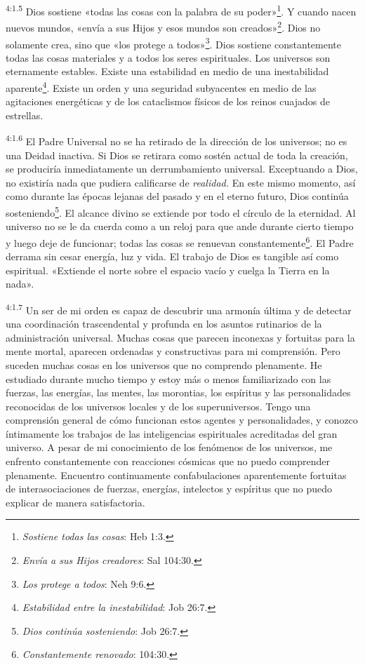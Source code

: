 \par
\textsuperscript{4:1.5} Dios sostiene «todas las cosas con la palabra de su poder»\footnote{\textit{Sostiene todas las cosas}: Heb 1:3.}. Y cuando nacen nuevos mundos, «envía a sus Hijos y esos mundos son creados»\footnote{\textit{Envía a sus Hijos creadores}: Sal 104:30.}. Dios no solamente crea, sino que «los protege a todos»\footnote{\textit{Los protege a todos}: Neh 9:6.}. Dios sostiene constantemente todas las cosas materiales y a todos los seres espirituales. Los universos son eternamente estables. Existe una estabilidad en medio de una inestabilidad aparente\footnote{\textit{Estabilidad entre la inestabilidad}: Job 26:7.}. Existe un orden y una seguridad subyacentes en medio de las agitaciones energéticas y de los cataclismos físicos de los reinos cuajados de estrellas.

\par
\textsuperscript{4:1.6} El Padre Universal no se ha retirado de la dirección de los universos; no es una Deidad inactiva. Si Dios se retirara como sostén actual de toda la creación, se produciría inmediatamente un derrumbamiento universal. Exceptuando a Dios, no existiría nada que pudiera calificarse de \textit{realidad.} En este mismo momento, así como durante las épocas lejanas del pasado y en el eterno futuro, Dios continúa sosteniendo\footnote{\textit{Dios continúa sosteniendo}: Job 26:7.}. El alcance divino se extiende por todo el círculo de la eternidad. Al universo no se le da cuerda como a un reloj para que ande durante cierto tiempo y luego deje de funcionar; todas las cosas se renuevan constantemente\footnote{\textit{Constantemente renovado}: 104:30.}. El Padre derrama sin cesar energía, luz y vida. El trabajo de Dios es tangible así como espiritual. «Extiende el norte sobre el espacio vacío y cuelga la Tierra en la nada».

\par
\textsuperscript{4:1.7} Un ser de mi orden es capaz de descubrir una armonía última y de detectar una coordinación trascendental y profunda en los asuntos rutinarios de la administración universal. Muchas cosas que parecen inconexas y fortuitas para la mente mortal, aparecen ordenadas y constructivas para mi comprensión. Pero suceden muchas cosas en los universos que no comprendo plenamente. He estudiado durante mucho tiempo y estoy más o menos familiarizado con las fuerzas, las energías, las mentes, las morontias, los espíritus y las personalidades reconocidas de los universos locales y de los superuniversos. Tengo una comprensión general de cómo funcionan estos agentes y personalidades, y conozco íntimamente los trabajos de las inteligencias espirituales acreditadas del gran universo. A pesar de mi conocimiento de los fenómenos de los universos, me enfrento constantemente con reacciones cósmicas que no puedo comprender plenamente. Encuentro continuamente confabulaciones aparentemente fortuitas de interasociaciones de fuerzas, energías, intelectos y espíritus que no puedo explicar de manera satisfactoria.


